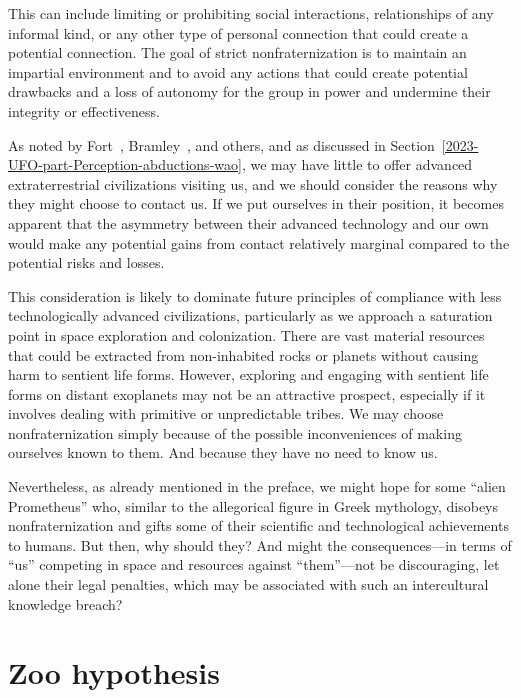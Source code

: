 This can include limiting or prohibiting social interactions, relationships of any informal kind,
or any other type of personal connection that could create a potential connection. The goal of strict nonfraternization is to maintain an impartial environment and to avoid any actions that could create potential drawbacks and a loss of autonomy for the group in power and undermine their integrity or effectiveness.

As noted by Fort~\cite{FortBotD}, Bramley~\cite{Bramley1993Mar}, and others,
and as discussed in Section~\ref{2023-UFO-part-Perception-abductions-wao},
we may have little to offer advanced extraterrestrial civilizations visiting us,
and we should consider the reasons why they might choose to contact us.
If we put ourselves in their position, it becomes apparent that the asymmetry between their advanced technology
and our own would make any potential gains from contact relatively marginal compared to the potential risks and losses.

This consideration is likely to dominate future principles of compliance with less technologically advanced civilizations,
particularly as we approach a saturation point in space exploration and colonization.
There are vast material resources that could be extracted from non-inhabited rocks or planets without causing harm to sentient life forms.
However, exploring and engaging with sentient life forms on distant exoplanets may not be an attractive prospect,
especially if it involves dealing with primitive or unpredictable tribes.
We may choose nonfraternization simply because of the possible inconveniences of making ourselves known to them.
And because they have no need to know us.

Nevertheless, as already mentioned in the preface, we might hope for some ``alien Prometheus'' who,
similar to the allegorical figure in Greek mythology, disobeys nonfraternization and gifts some of their scientific and technological achievements to humans.
But then, why should they?
And might the consequences---in terms of ``us'' competing in space and resources against ``them''---not be discouraging,
let alone their legal penalties, which may be associated with such an intercultural knowledge breach?

\section{Zoo hypothesis}
\label{2023-UFO-part-Speculation-among-hypercivilization-zoo-hypothesis-zh}

